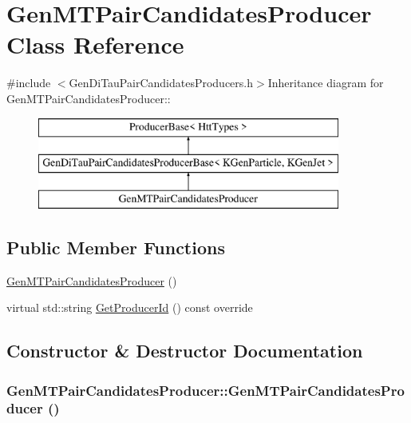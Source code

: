\hypertarget{classGenMTPairCandidatesProducer}{
\section{GenMTPairCandidatesProducer Class Reference}
\label{classGenMTPairCandidatesProducer}
}


{\ttfamily \#include $<$GenDiTauPairCandidatesProducers.h$>$}Inheritance diagram for GenMTPairCandidatesProducer::\begin{figure}[H]
\begin{center}
\leavevmode
\includegraphics[height=3cm]{classGenMTPairCandidatesProducer}
\end{center}
\end{figure}
\subsection*{Public Member Functions}
\begin{DoxyCompactItemize}
\item 
\hyperlink{classGenMTPairCandidatesProducer_a920fc9a8f0fa31de8bc71b7dc2be0e20}{GenMTPairCandidatesProducer} ()
\item 
virtual std::string \hyperlink{classGenMTPairCandidatesProducer_aa03cab7fc5713159a11b0487d3c22108}{GetProducerId} () const override
\end{DoxyCompactItemize}


\subsection{Constructor \& Destructor Documentation}
\hypertarget{classGenMTPairCandidatesProducer_a920fc9a8f0fa31de8bc71b7dc2be0e20}{
\subsubsection[{GenMTPairCandidatesProducer}]{\setlength{\rightskip}{0pt plus 5cm}GenMTPairCandidatesProducer::GenMTPairCandidatesProducer ()}}
\label{classGenMTPairCandidatesProducer_a920fc9a8f0fa31de8bc71b7dc2be0e20}


